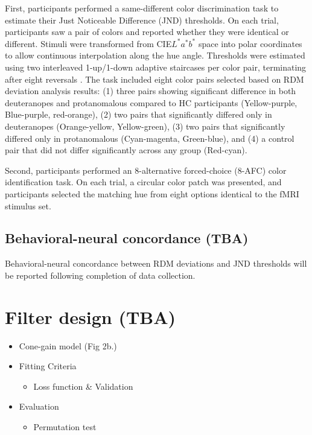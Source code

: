First, participants performed a same-different color discrimination task to estimate their Just Noticeable Difference (JND) thresholds. On each trial, participants saw a pair of colors and reported whether they were identical or different. Stimuli were transformed from CIE$L^*a^*b^*$ space into polar coordinates to allow continuous interpolation along the hue angle. Thresholds were estimated using two interleaved 1-up/1-down adaptive staircases per color pair, terminating after eight reversals \cite{levitt1971}. The task included eight color pairs selected based on RDM deviation analysis results: (1) three pairs showing significant difference in both deuteranopes and protanomalous compared to HC participants (Yellow-purple, Blue-purple, red-orange), (2) two pairs that significantly differed only in deuteranopes (Orange-yellow, Yellow-green), (3) two pairs that significantly differed only in protanomalous (Cyan-magenta, Green-blue), and (4) a control pair that did not differ significantly across any group (Red-cyan).

Second, participants performed an 8-alternative forced-choice (8-AFC) color identification task. On each trial, a circular color patch was presented, and participants selected the matching hue from eight options identical to the fMRI stimulus set.

\subsection*{Behavioral-neural concordance (TBA)}

Behavioral-neural concordance between RDM deviations and JND thresholds will be reported following completion of data collection.

\section{Filter design (TBA)}

\begin{itemize}
\item Cone-gain model (Fig 2b.)
\item Fitting Criteria
\begin{itemize}
\item Loss function \& Validation
\end{itemize}
\item Evaluation
\begin{itemize}
\item Permutation test
\end{itemize}
\end{itemize}

